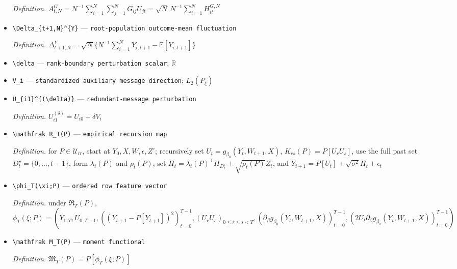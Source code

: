 \documentclass{article}
\begin{document}
\begin{itemize}
  \par\smallskip\noindent\emph{Definition.} \(A_{t,N}^{G}=N^{-1}\sum_{i=1}^N\sum_{j=1}^NG_{ij}U_{jt}=\sqrt N\,N^{-1}\sum_{i=1}^NH_{it}^{G,N}\)
  \item \texttt{\textbackslash{}\allowbreak{}Delta\_\allowbreak{}\{t+\allowbreak{}1,\allowbreak{}N\}\allowbreak{}\textasciicircum{}\{Y\}\allowbreak{}} --- \texttt{root-\allowbreak{}population outcome-\allowbreak{}mean fluctuation}
  \par\smallskip\noindent\emph{Definition.} \(\Delta_{t+1,N}^{Y}=\sqrt N\{N^{-1}\sum_{i=1}^NY_{i,t+1}-\mathbb E[Y_{i,t+1}]\}\)
  \item \texttt{\textbackslash{}\allowbreak{}delta} --- \texttt{rank-\allowbreak{}boundary perturbation scalar}; \(\mathbb R\)
  \item \texttt{V\_\allowbreak{}i} --- \texttt{standardized auxiliary message direction}; \(L_2(P_\xi)\)
  \item \texttt{U\_\allowbreak{}\{i1\}\allowbreak{}\textasciicircum{}\{(\textbackslash{}\allowbreak{}delta)\}\allowbreak{}} --- \texttt{redundant-\allowbreak{}message perturbation}
  \par\smallskip\noindent\emph{Definition.} \(U_{i1}^{(\delta)}=U_{i0}+\delta V_i\)
  \item \texttt{\textbackslash{}\allowbreak{}mathfrak R\_\allowbreak{}T(P)} --- \texttt{empirical recursion map}
  \par\smallskip\noindent\emph{Definition.} for \(P\in\mathcal U_{\mathrm{rr}}\), start at \(Y_0,X,W,\epsilon,Z^{\circ}\); recursively set \(U_t=g_{\beta_0}(Y_t,W_{t+1},X)\), \(K_{rs}(P)=P[U_rU_s]\), use the full past set \(D_t^{\star}=\{0,\ldots,t-1\}\), form \(\lambda_t(P)\) and \(\rho_t(P)\), set \(H_t=\lambda_t(P)^{\top}H_{D_t^{\star}}+\sqrt{\rho_t(P)}Z_t^{\circ}\), and \(Y_{t+1}=P[U_t]+\sqrt{\sigma^2}H_t+\epsilon_t\)
  \item \texttt{\textbackslash{}\allowbreak{}phi\_\allowbreak{}T(\textbackslash{}\allowbreak{}xi;\allowbreak{}P)} --- \texttt{ordered row feature vector}
  \par\smallskip\noindent\emph{Definition.} under \(\mathfrak R_T(P)\), \(\phi_T(\xi;P)=(Y_{1:T},U_{0:T-1},((Y_{t+1}-P[Y_{t+1}])^2)_{t=0}^{T-1},(U_rU_s)_{0\le r\le s<T},(\partial_\beta g_{\beta_0}(Y_t,W_{t+1},X))_{t=0}^{T-1},(2U_t\partial_\beta g_{\beta_0}(Y_t,W_{t+1},X))_{t=0}^{T-1})\)
  \item \texttt{\textbackslash{}\allowbreak{}mathfrak M\_\allowbreak{}T(P)} --- \texttt{moment functional}
  \par\smallskip\noindent\emph{Definition.} \(\mathfrak M_T(P)=P[\phi_T(\xi;P)]\)

\end{itemize}
\end{document}
